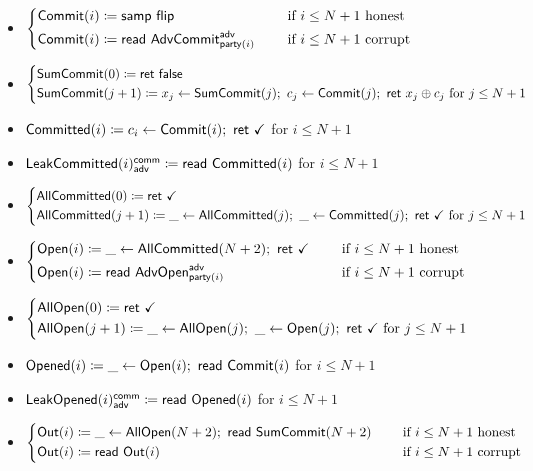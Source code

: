 \begin{itemize}
\item {\color{blue} $\begin{cases*} \Commit(i) \coloneqq \samp{\flip} & \hspace{10pt} \text{if $i \leq N+1$ honest} \\ \Commit(i) \coloneqq \read{\AdvCommit^\adv_{\party(i)}} & \hspace{10pt} \text{if $i \leq N+1$ corrupt} \end{cases*}$}
\item {\color{blue} $\begin{cases*} \SumCommit(0) \coloneqq \ret{\false} \\ \SumCommit(j+1) \coloneqq x_j \leftarrow \SumCommit(j); \ c_j \leftarrow \Commit(j); \ \ret{x_j \oplus c_j} \text{ for $j \leq N+1$} \end{cases*}$}
\item {\color{magenta} $\mathsf{Committed}(i) \coloneqq c_i \leftarrow \mathsf{Commit}(i); \ \mathsf{ret} \ \checkmark$ for $i \leq N+1$}
\item {\color{magenta} $\mathsf{LeakCommitted}(i)^{\mathsf{comm}}_{\mathsf{adv}} \coloneqq \mathsf{read} \ \mathsf{Committed}(i)$ for $i \leq N+1$}
\item {\color{magenta} $\begin{cases*} \AllCommitted(0) \coloneqq \ret{\checkmark} \\ \AllCommitted(j+1) \coloneqq \_ \leftarrow \AllCommitted(j); \ \_ \leftarrow \Committed(j); \ \ret{\checkmark} \text{ for $j \leq N+1$} \end{cases*}$}
\item {\color{teal} $\begin{cases*} \Open(i) \coloneqq \_ \leftarrow \AllCommitted(N+2); \ \ret{\checkmark} & \hspace{10pt} \text{if $i \leq N+1$ honest} \\ \Open(i) \coloneqq \read{\AdvOpen^\adv_{\party(i)}} & \hspace{10pt} \text{if $i \leq N+1$ corrupt} \end{cases*}$}
\item {\color{teal} $\begin{cases*} \AllOpen(0) \coloneqq \ret{\checkmark} \\ \AllOpen(j+1) \coloneqq \_ \leftarrow \AllOpen(j); \ \_ \leftarrow \Open(j); \ \ret{\checkmark} \text{ for $j \leq N+1$} \end{cases*}$}
\item {\color{red} $\mathsf{Opened}(i) \coloneqq \_ \leftarrow \mathsf{Open}(i); \ \mathsf{read} \ \mathsf{Commit}(i)$ for $i \leq N+1$}
\item {\color{red} $\mathsf{LeakOpened}(i)^{\mathsf{comm}}_{\mathsf{adv}} \coloneqq \mathsf{read} \ \mathsf{Opened}(i)$ for $i \leq N+1$}
\item $\begin{cases*} \Out(i) \coloneqq \_ \leftarrow \AllOpen(N+2); \ \read{\SumCommit(N+2)} & \hspace{10pt} \text{if $i \leq N+1$ honest} \\ \Out(i) \coloneqq \read{\Out(i)} & \hspace{10pt} \text{if $i \leq N+1$ corrupt} \end{cases*}$
\end{itemize}

